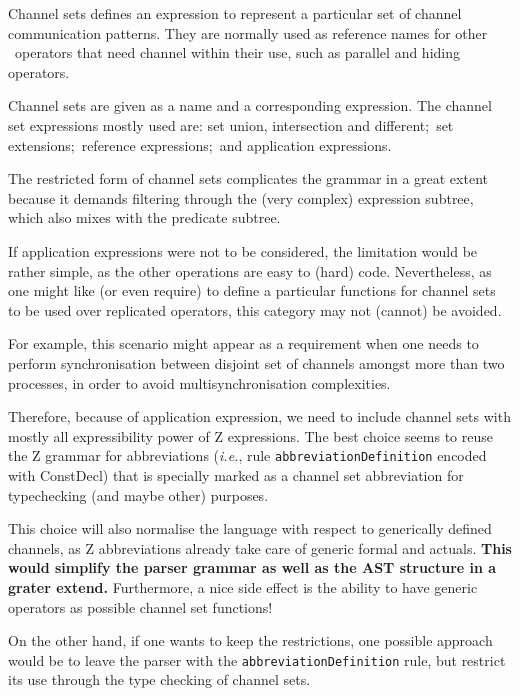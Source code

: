 \documentclass{article}
\newcommand{\grammar}[1]{\texttt{#1}}
\newcommand{\code}[1]{\textsf{#1}}
\begin{document}
Channel sets defines an expression to represent a particular set of channel
communication patterns. They are normally used as reference names for other
\Circus\ operators that need channel within their use, such as parallel and
hiding operators.

Channel sets are given as a name and a corresponding expression.
%
%
The channel set expressions mostly used are: set union, intersection and
different;~set extensions;~reference expressions;~and application expressions.

\begin{issue}
  The restricted form of channel sets complicates the grammar in a great
  extent because it demands filtering through the (very complex) expression
  subtree, which also mixes with the predicate subtree.

  If application expressions were not to be considered, the limitation would be
  rather simple, as the other operations are easy to (hard) code. Nevertheless,
  as one might like (or even require) to define a particular functions for
  channel sets to be used over replicated operators, this category may not (cannot) be
  avoided.

  For example, this scenario might appear as a requirement when one needs to perform
  synchronisation between disjoint set of channels amongst more than two processes,
  in order to avoid multisynchronisation complexities.

  Therefore, because of application expression, we need to include channel sets with mostly
  all expressibility power of Z expressions. The best choice seems to reuse the
  Z grammar for abbreviations (\textit{i.e.}, rule \grammar{abbreviationDefinition} encoded with \code{ConstDecl})
  that is specially marked as a channel set abbreviation for typechecking (and maybe other) purposes.

  This choice will also normalise the language with respect to generically
  defined channels, as Z abbreviations already take care of generic formal and
  actuals. \textbf{This would simplify the parser grammar as well as the AST structure in a grater
  extend.} Furthermore, a nice side effect is the ability to have generic
  operators as possible channel set functions!

  On the other hand, if one wants to keep the restrictions, one possible
  approach would be to leave the parser with the
  \grammar{abbreviationDefinition} rule, but restrict its use through the type
  checking of channel sets.
\end{issue}
\end{document}
